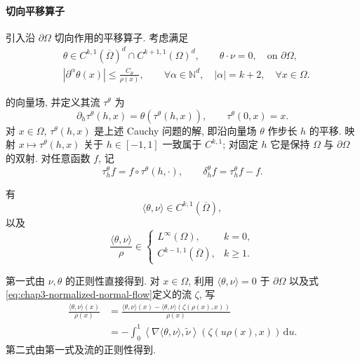 \paragraph{切向平移算子}

引入沿 $\partial\Omega$ 切向作用的平移算子. 考虑满足
\begin{equation}
 \begin{aligned}
 &\theta\in C^{k,1}(\overline\Omega)^d\cap C^{k+1,1}(\Omega)^d,
 \qquad \theta\cdot\nu=0,\quad\text{on }\partial\Omega,\\
 &|\partial^\alpha\theta(x)|\leq\frac{C_\theta}{\rho(x)},
 \qquad\forall\alpha\in\mathbb N^d,\quad |\alpha|=k+2,
 \quad\forall x\in\Omega.
 \end{aligned}
 \label{eq:chap3-admissible-tangential-field}
\end{equation}

的向量场, 并定义其流 $\tau^\theta$ 为
\begin{equation}
 \partial_h\tau^\theta(h,x)=\theta(\tau^\theta(h,x)),
 \qquad\tau^\theta(0,x)=x.
 \label{eq:chap3-tangential-flow}
\end{equation}
对 $x\in\Omega$, $\tau^\theta(h,x)$ 是上述 Cauchy 问题的解, 即沿向量场 $\theta$ 作步长 $h$ 的平移. 映射 $x\mapsto\tau^\theta(h,x)$ 关于 $h\in[-1,1]$ 一致属于 $C^{k,1}$; 对固定 $h$ 它是保持 $\Omega$ 与 $\partial\Omega$ 的双射. 对任意函数 $f$, 记
\[
 \tau_h^\theta f=f\circ\tau^\theta(h,\cdot),
 \qquad\delta_h^\theta f=\tau_h^\theta f-f.
\]

\begin{Lemma}
\label{lem:chap3-tangential-field-normal-component}
有
\begin{equation}
 \langle\theta,\nu\rangle\in C^{k,1}(\overline\Omega),
 \label{eq:chap3-tangential-normal-regularity}
\end{equation}
以及
\begin{equation}
 \frac{\langle\theta,\nu\rangle}{\rho}\in
 \begin{cases}L^\infty(\Omega),&k=0,\\C^{k-1,1}(\overline\Omega),&k\geq1.
 \end{cases}
 \label{eq:chap3-tangential-normal-over-distance}
\end{equation}
\end{Lemma}

\begin{Proof}
第一式由 $\nu,\theta$ 的正则性直接得到. 对 $x\in\Omega$, 利用 $\langle\theta,\nu\rangle=0$ 于 $\partial\Omega$ 以及式\eqref{eq:chap3-normalized-normal-flow}定义的流 $\zeta$, 写
\begin{align*}
 \frac{\langle\theta,\nu\rangle(x)}{\rho(x)}
 &=\frac{\langle\theta,\nu\rangle(x)-
 \langle\theta,\nu\rangle(\zeta(\rho(x),x))}{\rho(x)}\\
 &=-\int_0^1\left\langle
 \nabla\langle\theta,\nu\rangle,
 \widetilde\nu\right\rangle(\zeta(u\rho(x),x))\,\mathrm du.
\end{align*}
第二式由第一式及流的正则性得到.
\end{Proof}

